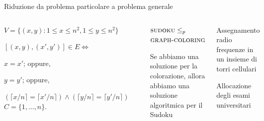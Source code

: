 \begin{frame}{Riduzione da problema particolare a problema generale}

\small
\vspace{-17pt}
\begin{columns}[T]
\begin{myboxtitle}
\noindent
$V=\{ (x,y) : 1 \leq x \leq n^2, 1 \leq y \leq n^2 \}$

\smallskip\noindent
$[(x,y), (x',y')] \in E \Leftrightarrow {}$
\BI
\item $x=x'$; oppure,
\item $y=y'$; oppure,
\item $(\lceil x/n \rceil = \lceil x'/n \rceil) \wedge (\lceil y/n \rceil = \lceil y'/n \rceil)$
\EI
\smallskip\noindent
$C = \{1, \ldots, n \}$.
\end{myboxtitle}

\vspace{-9pt}
\begin{center}
\end{center}

\begin{myboxtitle}[Riduzione]
$\textsc{sudoku} \leq_p {}$\\
$\textsc{graph-coloring}$

\smallskip
Se abbiamo una soluzione per la colorazione, allora abbiamo una soluzione algoritmica per il Sudoku
\end{myboxtitle}

\begin{myboxtitle}[Applicazioni]
\noindent
Assegnamento radio frequenze in un insieme di torri cellulari

\medskip\noindent
Allocazione degli esami universitari
\end{myboxtitle}

\end{columns}

\end{frame}


